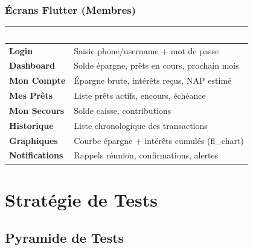 \documentclass[12pt, a4paper]{report}
\begin{document}
\subsection{Écrans Flutter (Membres)}

\begin{center}
\begin{tabular}{L{4cm}L{9cm}}
  \toprule
  \textcolor{white}{\textbf{Écran}} &
  \textcolor{white}{\textbf{Contenu}} \\
  \midrule
  \textbf{Login}          & Saisie phone/username + mot de passe \\
  \textbf{Dashboard}      & Solde épargne, prêts en cours, prochain mois \\
  \textbf{Mon Compte}     & Épargne brute, intérêts reçus, NAP estimé \\
  \textbf{Mes Prêts}      & Liste prêts actifs, encours, échéance \\
  \textbf{Mon Secours}    & Solde caisse, contributions \\
  \textbf{Historique}     & Liste chronologique des transactions \\
  \textbf{Graphiques}     & Courbe épargne + intérêts cumulés (fl\_chart) \\
  \textbf{Notifications}  & Rappels réunion, confirmations, alertes \\
  \bottomrule
\end{tabular}
\end{center}

\chapter{Stratégie de Tests}

\section{Pyramide de Tests}

\begin{center}
\end{center}
\end{document}
